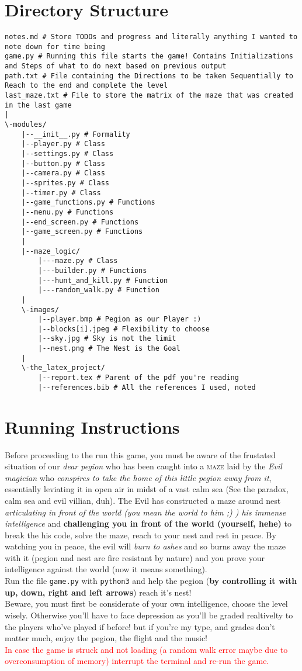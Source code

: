 \documentclass{article}
\begin{document}
\section{Directory Structure}
\begin{lstlisting}
notes.md # Store TODOs and progress and literally anything I wanted to note down for time being
game.py # Running this file starts the game! Contains Initializations and Steps of what to do next based on previous output
path.txt # File containing the Directions to be taken Sequentially to Reach to the end and complete the level
last_maze.txt # File to store the matrix of the maze that was created in the last game
|
\-modules/
    |--__init__.py # Formality
    |--player.py # Class
    |--settings.py # Class
    |--button.py # Class
    |--camera.py # Class
    |--sprites.py # Class
    |--timer.py # Class
    |--game_functions.py # Functions
    |--menu.py # Functions
    |--end_screen.py # Functions
    |--game_screen.py # Functions
    |
    |--maze_logic/
        |---maze.py # Class
        |---builder.py # Functions
        |---hunt_and_kill.py # Function
        |---random_walk.py # Function
    |
    \-images/
        |--player.bmp # Pegion as our Player :)
        |--blocks[i].jpeg # Flexibility to choose
        |--sky.jpg # Sky is not the limit
        |--nest.png # The Nest is the Goal
    |
    \-the_latex_project/
        |--report.tex # Parent of the pdf you're reading
        |--references.bib # All the references I used, noted
\end{lstlisting}
\section{Running Instructions}
Before proceeding to the run this game, you must be aware of the frustated situation of our \textit{dear pegion} who has been caught into a \textsc{maze} laid by the \textit{Evil magician} who \textsl{conspires to take the home of this little pegion away from it}, essentially leviating it in open air in midst of a vast calm sea (See the paradox, calm sea and evil villian, duh). The Evil has constructed a maze around nest \textit{articulating in front of the world (you mean the world to him ;) ) his immense intelligence} and \textbf{challenging you in front of the world (yourself, hehe)} to break the his code, solve the maze, reach to your nest and rest in peace. By watching you in peace, the evil will \textit{burn to ashes} and so burns away the maze with it (pegion and nest are fire resistant by nature) and you prove your intelligence against the world (now it means something).\\
Run the file \texttt{game.py} with \texttt{python3} and help the pegion (\textbf{by controlling it with up, down, right and left arrows}) reach it's nest!\\
Beware, you must first be considerate of your own intelligence, choose the level wisely. Otherwise you'll have to face depression as you'll be graded realtivelty to the players who've played if before! but if you're my type, and grades don't matter much, enjoy the pegion, the flight and the music!\\
\textcolor{red}{In case the game is struck and not loading (a random walk error maybe due to overconsumption of memory) interrupt the terminal and re-run the game.}
\end{document}
